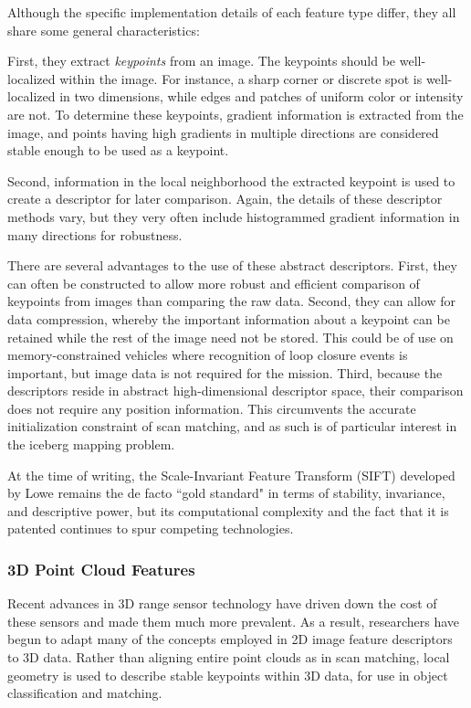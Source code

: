 Although the specific implementation details of each feature type differ, they all share some general characteristics:

First, they extract \emph{keypoints} from an image. The keypoints should be well-localized within the image. For instance, a sharp corner or discrete spot is well-localized in two dimensions, while edges and patches of uniform color or intensity are not. To determine these keypoints, gradient information is extracted from the image, and points having high gradients in multiple directions are considered stable enough to be used as a keypoint. 

Second, information in the local neighborhood the extracted keypoint is used to create a descriptor for later comparison. Again, the details of these descriptor methods vary, but they very often include histogrammed gradient information in many directions for robustness. 

There are several advantages to the use of these abstract descriptors. First, they can often be constructed to allow more robust and efficient comparison of keypoints from images than comparing the raw data. Second, they can allow for data compression, whereby the important information about a keypoint can be retained while the rest of the image need not be stored. This could be of use on memory-constrained vehicles where recognition of loop closure events is important, but image data is not required for the mission. Third, because the descriptors reside in abstract high-dimensional descriptor space, their comparison does not require any position information. This circumvents the accurate initialization constraint of scan matching, and as such is of particular interest in the iceberg mapping problem.

At the time of writing, the Scale-Invariant Feature Transform (SIFT) developed by Lowe \cite{Lowe} remains the de facto ``gold standard" in terms of stability, invariance, and descriptive power, but its computational complexity and the fact that it is patented continues to spur competing technologies. \cite{challengers}

\subsubsection{3D Point Cloud Features}

Recent advances in 3D range sensor technology have driven down the cost of these sensors and made them much more prevalent. As a result, researchers have begun to adapt many of the concepts employed in 2D image feature descriptors to 3D data. Rather than aligning entire point clouds as in scan matching, local geometry is used to describe stable keypoints within 3D data, for use in object classification and matching. 

